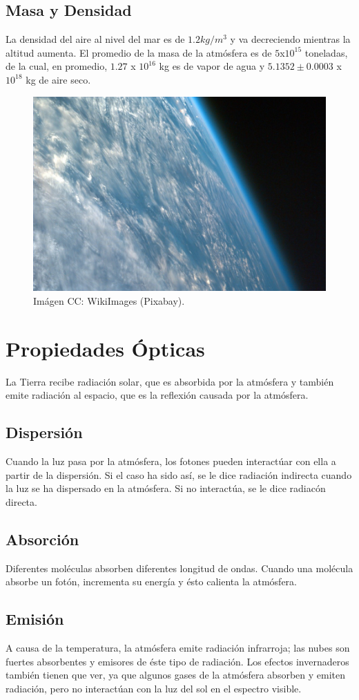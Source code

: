 \documentclass{article}
\begin{document}
\subsection{Masa y Densidad}
La densidad del aire al nivel del mar es de $1.2 kg/m^3$ y va decreciendo mientras la altitud aumenta. El promedio de la masa de la atmósfera es de $5$x$10^{15}$ toneladas, de la cual, en promedio, $1.27$ x $10^{16}$ kg es de vapor de agua y $5.1352 \pm 0.0003$ x $10^{18}$ kg de aire seco.

\begin{figure}[h]
  \centering
  \includegraphics[width=0.4\linewidth]{atmosfera3.jpg}
  \caption{Imágen CC: WikiImages (Pixabay).}
\end{figure}

\section{Propiedades Ópticas}
La Tierra recibe radiación solar, que es absorbida por la atmósfera y también emite radiación al espacio, que es la reflexión causada por la atmósfera.
\subsection{Dispersión}
Cuando la luz pasa por la atmósfera, los fotones pueden interactúar con ella a partir de la dispersión. Si el caso ha sido así, se le dice radiación indirecta cuando la luz se ha dispersado en la atmósfera. Si no interactúa, se le dice radiacón directa.
\subsection{Absorción}
Diferentes moléculas absorben diferentes longitud de ondas. Cuando una molécula absorbe un fotón, incrementa su energía y ésto calienta la atmósfera.
\subsection{Emisión}
A causa de la temperatura, la atmósfera emite radiación infrarroja; las nubes son fuertes absorbentes y emisores de éste tipo de radiación. Los efectos invernaderos también tienen que ver, ya que algunos gases de la atmósfera absorben y emiten radiación, pero no interactúan con la luz del sol en el espectro visible.
\end{document}
